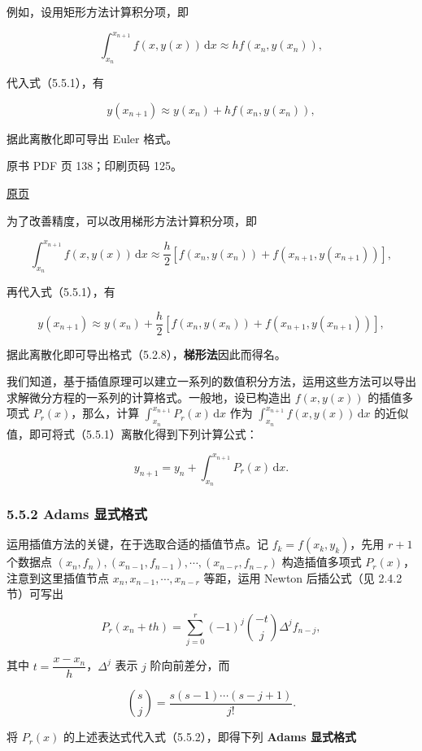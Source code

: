 例如，设用矩形方法计算积分项，即

\[
\int_{x_n}^{x_{n+1}}f(x,y(x))\,\mathrm dx\approx hf(x_n,y(x_n)),
\]

代入式（5.5.1），有

\[
y(x_{n+1})\approx y(x_n)+hf(x_n,y(x_n)),
\]

据此离散化即可导出 Euler 格式。

\clearpage

原书 PDF 页 138；印刷页码 125。

\href{source-images/pdf-138.jpeg}{原页}

为了改善精度，可以改用梯形方法计算积分项，即

\[
\int_{x_n}^{x_{n+1}}f(x,y(x))\,\mathrm dx\approx\frac h2[f(x_n,y(x_n))+f(x_{n+1},y(x_{n+1}))],
\]

再代入式（5.5.1），有

\[
y(x_{n+1})\approx y(x_n)+\frac h2[f(x_n,y(x_n))+f(x_{n+1},y(x_{n+1}))],
\]

据此离散化即可导出格式（5.2.8），\textbf{梯形法}因此而得名。

我们知道，基于插值原理可以建立一系列的数值积分方法，运用这些方法可以导出求解微分方程的一系列的计算格式。一般地，设已构造出 \(f(x,y(x))\) 的插值多项式 \(P_r(x)\)，那么，计算 \(\int_{x_n}^{x_{n+1}}P_r(x)\,\mathrm dx\) 作为 \(\int_{x_n}^{x_{n+1}}f(x,y(x))\,\mathrm dx\) 的近似值，即可将式（5.5.1）离散化得到下列计算公式：

\[
y_{n+1}=y_n+\int_{x_n}^{x_{n+1}}P_r(x)\,\mathrm dx.
\tag{5.5.2}
\]

\subsubsection{5.5.2 Adams 显式格式}\label{ch05b-adams-ux663eux5f0fux683cux5f0f}

运用插值方法的关键，在于选取合适的插值节点。记 \(f_k=f(x_k,y_k)\)，先用 \(r+1\) 个数据点 \((x_n,\allowbreak f_n),\allowbreak (x_{n-1},\allowbreak f_{n-1}),\allowbreak \cdots,\allowbreak (x_{n-r},\allowbreak f_{n-r})\) 构造插值多项式 \(P_r(x)\)，注意到这里插值节点 \(x_n,x_{n-1},\cdots,x_{n-r}\) 等距，运用 Newton 后插公式（见 2.4.2 节）可写出

\[
P_r(x_n+th)=\sum_{j=0}^r(-1)^j\binom{-t}{j}\Delta^j f_{n-j},
\]

其中 \(t=\dfrac{x-x_n}{h}\)，\(\Delta^j\) 表示 \(j\) 阶向前差分，而

\[
\binom sj=\frac{s(s-1)\cdots(s-j+1)}{j!}.
\]

将 \(P_r(x)\) 的上述表达式代入式（5.5.2），即得下列 \textbf{Adams 显式格式}

